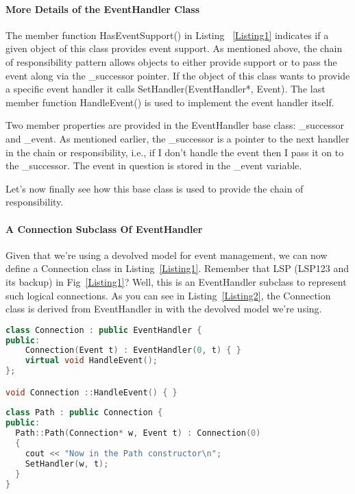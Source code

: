 \documentclass{book}
\begin{document}
\paragraph{More Details of the EventHandler Class}

The member function HasEventSupport() in Listing ~\ref{Listing1} indicates if a given object of this class provides event support.
As mentioned above, the chain of responsibility pattern allows objects to either provide support or to pass the event along via the \_successor pointer.
If the object of this class wants to provide a specific event handler it calls SetHandler(EventHandler*, Event).
The last member function HandleEvent() is used to implement the event handler itself.

Two member properties are provided in the EventHandler base class: \_successor and \_event.
As mentioned earlier, the \_successor is a pointer to the next handler in the chain or responsibility,
i.e., if I don't handle the event then I pass it on to the \_successor. The event in question is stored in the \_event variable.

Let's now finally see how this base class is used to provide the chain of responsibility.

\paragraph{A Connection Subclass Of EventHandler}

Given that we're using a devolved model for event management, we can now define a Connection class in Listing~\ref{Listing1}. Remember that LSP (LSP123 and its backup) in Fig~\ref{Listing1}?
Well, this is an EventHandler subclass to represent such logical connections. As you can see in Listing~\ref{Listing2},
the Connection class is derived from EventHandler in with the devolved model we're using.
	
\begin{lstlisting}[caption={Connection—A derived class of EventHandler},label={Listing2},language=C++ ]
class Connection : public EventHandler {
public:
    Connection(Event t) : EventHandler(0, t) { }
    virtual void HandleEvent(); 
};

void Connection ::HandleEvent() { }
 
class Path : public Connection {
public:
  Path::Path(Connection* w, Event t) : Connection(0)
  {
    cout << "Now in the Path constructor\n";
    SetHandler(w, t);  
  }
}
\end{lstlisting}
\end{document}
